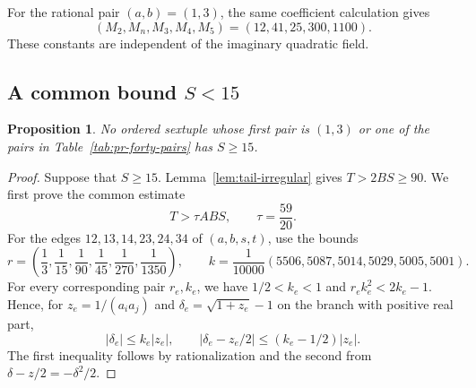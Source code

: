 \documentclass[12pt]{article}
\newtheorem{proposition}[theorem]{Proposition}
\numberwithin{equation}{section}
\begin{document}
For the rational pair $(a,b)=(1,3)$, the same coefficient calculation gives
\[
 (M_2,M_n,M_3,M_4,M_5)=(12,41,25,300,1100).
\]
These constants are independent of the imaginary quadratic field.


\subsection{A common bound \texorpdfstring{$S<15$}{S<15}}

\begin{proposition}\label{prop:pr-S15}
No ordered sextuple whose first pair is $(1,3)$ or one of the pairs in
Table~\ref{tab:pr-forty-pairs} has $S\ge15$.
\end{proposition}
\begin{proof}
Suppose that $S\ge15$. Lemma~\ref{lem:tail-irregular} gives
$T>2BS\ge90$. We first prove the common estimate
\begin{equation}\label{eq:pr-fixed-fourth-gap}
 T>\tau ABS,\qquad \tau=\frac{59}{20}.
\end{equation}
For the edges $12,13,14,23,24,34$ of $(a,b,s,t)$, use the bounds
\[
 r=\left(\frac13,\frac1{15},\frac1{90},
          \frac1{45},\frac1{270},\frac1{1350}\right),\qquad
 k=\frac1{10000}(5506,5087,5014,5029,5005,5001).
\]
For every corresponding pair $r_e,k_e$, we have
$1/2<k_e<1$ and $r_ek_e^2<2k_e-1$.
Hence, for $z_e=1/(a_i a_j)$ and
$\delta_e=\sqrt{1+z_e}-1$ on the branch with positive real part,
\[
 |\delta_e|\le k_e|z_e|,\qquad
 |\delta_e-z_e/2|\le(k_e-1/2)|z_e|.
\]
The first inequality follows by rationalization and the second from
$\delta-z/2=-\delta^2/2$.


\end{proof}
\end{document}
